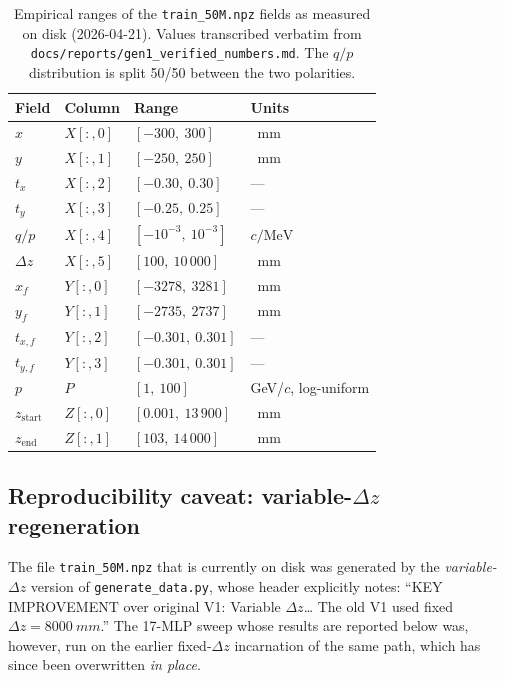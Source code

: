 \documentclass[a4paper,11pt]{article}
\newcommand{\SI}[2]{#1~#2}
\newcommand{\mm}{mm}
\newcommand{\qop}{q/p}
\newcommand{\dz}{\Delta z}
\begin{document}
\begin{table}[h]
\centering\small
\begin{tabular}{llll}
\toprule
Field & Column & Range & Units\\
\midrule
$x$                 & $X[:,0]$ & $[-300,\ 300]$          & \SI{}{\mm}\\
$y$                 & $X[:,1]$ & $[-250,\ 250]$          & \SI{}{\mm}\\
$t_x$               & $X[:,2]$ & $[-0.30,\ 0.30]$        & ---\\
$t_y$               & $X[:,3]$ & $[-0.25,\ 0.25]$        & ---\\
$\qop$              & $X[:,4]$ & $[-10^{-3},\ 10^{-3}]$  & $c/\mathrm{MeV}$\\
$\dz$               & $X[:,5]$ & $[100,\ 10\,000]$       & \SI{}{\mm}\\
\midrule
$x_f$               & $Y[:,0]$ & $[-3278,\ 3281]$        & \SI{}{\mm}\\
$y_f$               & $Y[:,1]$ & $[-2735,\ 2737]$        & \SI{}{\mm}\\
$t_{x,f}$           & $Y[:,2]$ & $[-0.301,\ 0.301]$      & ---\\
$t_{y,f}$           & $Y[:,3]$ & $[-0.301,\ 0.301]$      & ---\\
\midrule
$p$                 & $P$      & $[1,\ 100]$             & GeV/$c$, log-uniform\\
$z_{\text{start}}$  & $Z[:,0]$ & $[0.001,\ 13\,900]$     & \SI{}{\mm}\\
$z_{\text{end}}$    & $Z[:,1]$ & $[103,\ 14\,000]$       & \SI{}{\mm}\\
\bottomrule
\end{tabular}
\caption{Empirical ranges of the \texttt{train\_50M.npz} fields as measured
  on disk (2026-04-21). Values transcribed verbatim from
  \texttt{docs/reports/gen1\_verified\_numbers.md}. The $\qop$ distribution
  is split 50/50 between the two polarities.}
\label{gen1:tab:dataranges}
\end{table}

\subsection{Reproducibility caveat: variable-$\dz$ regeneration}

The file \texttt{train\_50M.npz} that is currently on disk was generated
by the \emph{variable-}$\dz$ version of \texttt{generate\_data.py}, whose
header explicitly notes: ``KEY IMPROVEMENT over original V1: Variable
$\dz$\ldots{} The old V1 used fixed $\dz=\SI{8000}{\mm}$.''  The 17-MLP
sweep whose results are reported below was, however, run on the earlier
fixed-$\dz$ incarnation of the same path, which has since been overwritten
\emph{in place}.
\end{document}
